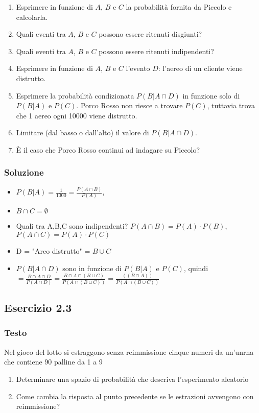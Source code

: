 \begin{enumerate}[label=(\alph*)]
    \item Esprimere in funzione di \(A\), \(B\) e \(C\) la probabilità fornita da Piccolo e calcolarla.
    \item Quali eventi tra \(A\), \(B\) e \(C\) possono essere ritenuti disgiunti?
    \item Quali eventi tra \(A\), \(B\) e \(C\) possono essere ritenuti indipendenti?
    \item Esprimere in funzione di \(A\), \(B\) e \(C\) l’evento \(D\): l’aereo di un cliente viene distrutto.
    \item Esprimere la probabilità condizionata \(P(B|A \cap D)\) in funzione solo di \(P(B|A)\) e \(P(C)\).
    Porco Rosso non riesce a trovare \(P(C)\), tuttavia trova che 1 aereo ogni 10000 viene distrutto.
    \item Limitare (dal basso o dall’alto) il valore di \(P(B|A \cap D)\).
    \item È il caso che Porco Rosso continui ad indagare su Piccolo?
\end{enumerate}

\subsubsection{Soluzione}
\begin{itemize}
    \item $P(B|A) = \frac{1}{1000} = \frac{P(A\cap B)}{P(A)}$, 
    \item $B\cap C = \emptyset$
    \item Quali tra A,B,C   sono indipendenti? $P(A\cap B) = P(A)\cdot P(B)$, $P(A\cap C) = P(A)\cdot P(C)$
    \item D = "Areo distrutto" = $B\cup C$
    \item $P(B | A\cap D)$ sono in funzione di $P(B|A)$ e $P(C)$, quindi $= \frac{B\cap A \cap D}{P(A\cap D)} = \frac{B\cap A\cap (B \sqcup C)}{ P(A\cap (B\sqcup C))} = \frac{((B\cap A))}{P(A \cap (B \cup C))} $
\end{itemize}

\subsection{Esercizio 2.3}
\subsubsection{Testo}
Nel gioco del lotto si estraggono senza reimmissione cinque numeri da un'unrna che contiene 90 palline da 1 a 9
\begin{enumerate}
    \item Determinare una spazio di probabilità che descriva l'esperimento aleatorio
    \item Come cambia la risposta al punto precedente se le estrazioni avvengono con reimmissione?
\end{enumerate}

